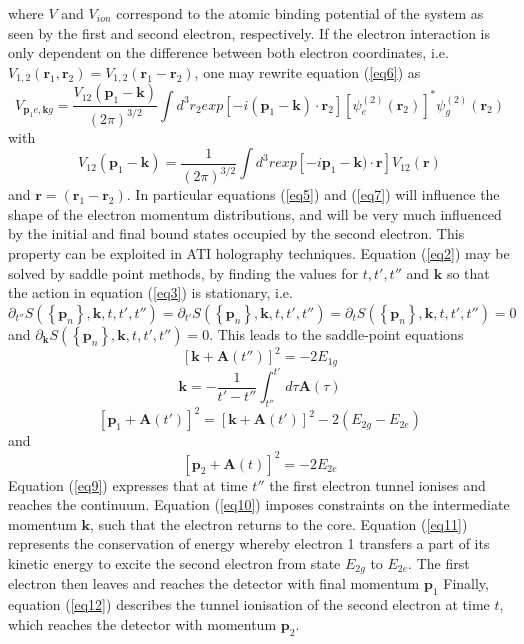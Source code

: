 \documentclass[11pt]{article}
\numberwithin{equation}{section}
\begin{document}
where $V$ and $V_{ion}$ correspond to the atomic binding
potential of the system as seen by the first and second
electron, respectively. If the electron interaction
is only dependent on the difference between both
electron coordinates, i.e. $V_{1,2}(\mathbf{r}_1,\mathbf{r}_2) = V_{1,2}(\mathbf{r}_1 -\mathbf{r}_2) $,
one may rewrite equation (\ref{eq6}) as
\begin{equation} \label{eq7}
    V_{\mathbf{p}_1e,\mathbf{k}g} = \frac{V_{12}(\mathbf{p}_1-\mathbf{k})}{(2\pi)^{3/2}} \int d^3 r_2 exp[-i(\mathbf{p}_1-\mathbf{k})\cdot\mathbf{r}_2]\left [ \psi_e^{(2)}(\mathbf{r}_2) \right ]^\ast \psi_g^{(2)}(\mathbf{r}_2)
\end{equation}
with
\begin{equation}
    V_{12}(\mathbf{p}_1-\mathbf{k}) = \frac{1}{(2\pi)^{3/2}} \int d^3r exp[-i\mathbf{p}_1-\mathbf{k})\cdot \mathbf{r}]V_{12}(\mathbf{r})
\end{equation}
and $\mathbf{r} = (\mathbf{r}_1 -\mathbf{r}_2)$.
\newline
In particular equations (\ref{eq5})
and (\ref{eq7}) will influence the shape of the electron momentum distributions, and will be very much
influenced by the initial and final bound states occupied by the second electron. This property can be exploited in ATI holography techniques\cite{maxwell_2017_analytic}.
Equation (\ref{eq2}) may be solved by saddle point methods, by finding the values for $t, t', t''$ and $\mathbf{k}$
so that the action in equation (\ref{eq3}) is stationary, i.e. $\partial_{t''}S(\left \{ \mathbf{p}_n  \right \},\mathbf{k},t,t',t'') = \partial_{t'}S(\left \{ \mathbf{p}_n  \right \},\mathbf{k},t,t',t'') = \partial_tS(\left \{ \mathbf{p}_n  \right \},\mathbf{k},t,t',t'') = 0$ and $\partial_\mathbf{k}S(\left \{ \mathbf{p}_n  \right \},\mathbf{k},t,t',t'') = 0$. This leads to the saddle-point
equations
\begin{equation} \label{eq9}
    [\mathbf{k} + \mathbf{A}(t'')]^2 = -2E_{1g}
\end{equation}
\begin{equation} \label{eq10}
    \mathbf{k} = -\frac{1}{t'-t''}\int_{t''}^{t'}d\tau \mathbf{A}(\tau)
\end{equation}
\begin{equation} \label{eq11}
    [\mathbf{p}_1+\mathbf{A}(t')]^2 = [\mathbf{k} + \mathbf{A}(t')]^2  - 2(E_{2g}-E_{2e})
\end{equation}
and
\begin{equation} \label{eq12}
    [\mathbf{p}_2 + \mathbf{A}(t)]^2 = -2E_{2e}
\end{equation}
Equation (\ref{eq9}) expresses that at time $t''$ the first electron tunnel ionises and reaches the continuum. Equation (\ref{eq10}) imposes constraints on the intermediate momentum $\mathbf{k}$, such that the electron returns to the core. Equation (\ref{eq11}) represents the conservation of energy whereby electron 1 transfers a part of its kinetic energy to excite the second electron from state $E_{2g}$ to $E_{2e}$. The first electron then leaves and reaches the detector with final momentum $\mathbf{p}_1$ Finally, equation (\ref{eq12}) describes the tunnel ionisation of the second electron at time $t$, which reaches the detector with momentum $\mathbf{p}_2$.
\end{document}
